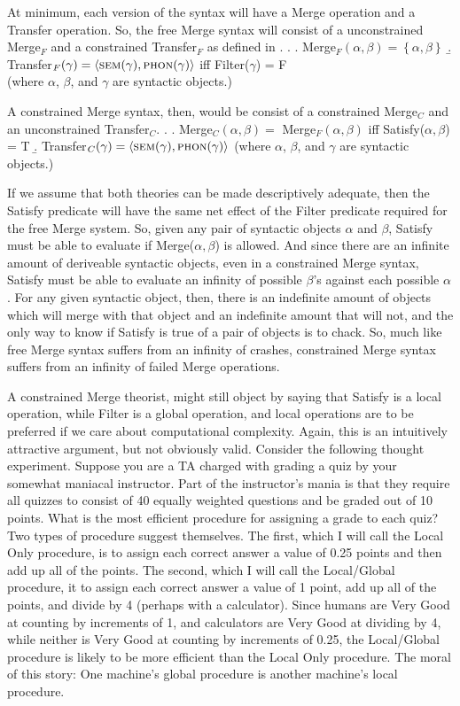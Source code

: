 \documentclass[MilwayThesis]{subfiles}
\begin{document}
At minimum, each version of the syntax will have a Merge operation and a Transfer operation.
So, the free Merge syntax will consist of a unconstrained Merge$_F$ and a constrained Transfer$_F$ as defined in \Next.
\ex.
\a. Merge$_F(\alpha,\beta) = \left\{ \alpha, \beta \right\}$ 
\b. Transfer$_F(\gamma) = \langle\textsc{sem}(\gamma), \textsc{phon}(\gamma)\rangle$ iff Filter($\gamma$) = F\\
(where $\alpha$, $\beta$, and $\gamma$ are syntactic objects.)

A constrained Merge syntax, then, would be consist of a constrained Merge$_C$ and an unconstrained Transfer$_C$.
\ex.
\a. Merge$_C(\alpha,\beta) =$ Merge$_F(\alpha,\beta)$ iff Satisfy($\alpha,\beta$) = T
\b. Transfer$_C(\gamma) = \langle\textsc{sem}(\gamma), \textsc{phon}(\gamma)\rangle$
(where $\alpha$, $\beta$, and $\gamma$ are syntactic objects.)

If we assume that both theories can be made descriptively adequate, then the Satisfy predicate will have the same net effect of the Filter predicate required for the free Merge system.
So, given any pair of syntactic objects $\alpha$ and $\beta$, Satisfy must be able to evaluate if Merge($\alpha,\beta$) is allowed.
And since there are an infinite amount of deriveable syntactic objects, even in a constrained Merge syntax, Satisfy must be able to evaluate an infinity of possible $\beta$'s against each possible $\alpha$.
For any given syntactic object, then, there is an indefinite amount of objects which will merge with that object and an indefinite amount that will not, and the only way to know if Satisfy is true of a pair of objects is to chack.
So, much like free Merge syntax suffers from an infinity of crashes, constrained Merge syntax suffers from an infinity of failed Merge operations.

A constrained Merge theorist, might still object by saying that Satisfy is a local operation, while Filter is a global operation, and local operations are to be preferred if we care about computational complexity.
Again, this is an intuitively attractive argument, but not obviously valid.
Consider the following thought experiment.
Suppose you are a TA charged with grading a quiz by your somewhat maniacal instructor.
Part of the instructor's mania is that they require all quizzes to consist of 40 equally weighted questions and be graded out of 10 points.
What is the most efficient procedure for assigning a grade to each quiz?
Two types of procedure suggest themselves.
The first, which I will call the Local Only procedure, is to assign each correct answer a value of 0.25 points and then add up all of the points.
The second, which I will call the Local/Global procedure, it to assign each correct answer a value of 1 point, add up all of the points, and divide by 4 (perhaps with a calculator).
Since humans are Very Good at counting by increments of 1, and calculators are Very Good at dividing by 4, while neither is Very Good at counting by increments of 0.25, the Local/Global procedure is likely to be more efficient than the Local Only procedure.
The moral of this story: One machine's global procedure is another machine's local procedure.
\end{document}
